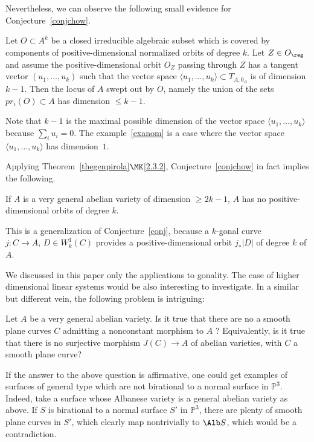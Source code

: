 Nevertheless, we can observe the following small evidence for Conjecture~\ref{conjchow}.

\begin{lemm}\label{ledimorbitavechypot}
Let $O\subset A^k$ be a closed irreducible algebraic subset which is covered by components of positive-dimensional normalized orbits of degree $k$. Let $Z\in O_{\reg}$ and assume
the positive-dimensional orbit $O_Z$ passing through $Z$ has a tangent vector $(u_1,\dots, u_k)$ such that the vector space $\langle u_1,\dots,u_k\rangle\subset T_{A,0_A}$ is of dimension $k-1$. Then the locus of $A$ swept out by $O$, namely the union of the sets $pr_i(O)\subset A$ has dimension $\leq k-1$.
\end{lemm}

Note that $k-1$ is the maximal possible dimension of the vector space $\langle u_1,\dots,u_k\rangle$ because $\sum_iu_i=0$. The example~\ref{exanom} is a case where the vector space $\langle u_1,\dots,u_k\rangle$ has dimension~$1$.

Applying Theorem~\ref{thegenpirola}$\MK$\eqref{2.3.2}, Conjecture~\ref{conjchow} in fact implies the following.

\begin{conj}\label{conjchowdeux}
If $A$ is a very general abelian variety of dimension $\geq 2k-1$, $A$ has no positive-dimensional orbits of degree $k$.
\end{conj}

This is a generalization of Conjecture~\ref{conj}, because a $k$-gonal curve ${j}:{C}\rightarrow A,\,D\in W_k^1(C)$ provides a positive-dimensional orbit ${j}_*|D|$ of degree $k$ of $A$.

We discussed in this paper only the applications to gonality. The case of higher dimensional linear systems would be also interesting to investigate. In a similar but different vein, the following problem is intriguing:

\begin{ques}\label{questionplancurve}
Let $A$ be a very general abelian variety. Is it true that there are no a smooth plane curves $C$ admitting a nonconstant morphism to $ A$ ? Equivalently, is it true that there is no surjective morphism $J(C)\rightarrow A$ of abelian varieties, with $C$ a smooth plane curve?
\end{ques}

If the answer to the above question is affirmative, one could get examples of surfaces of general type which are not birational to a normal surface in $\mathbb{P}^3$. Indeed, take a surface whose Albanese variety is a general abelian variety as above. If $S$ is birational to a normal surface $S'$ in $\mathbb{P}^3$, there are plenty of smooth plane curves in $S'$, which clearly map nontrivially to $\Alb S$, which would be a contradiction.

